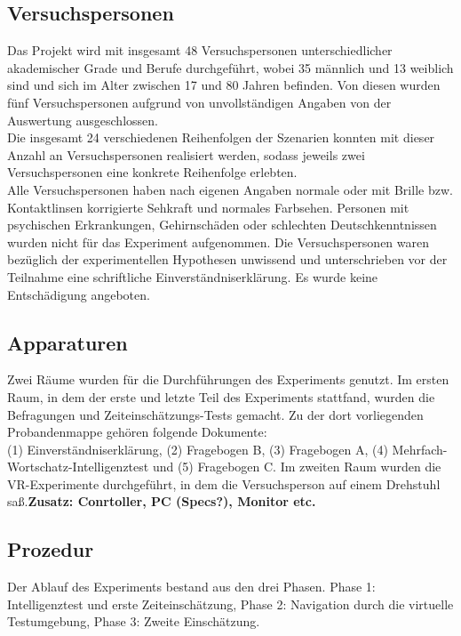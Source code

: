 \documentclass{Paper}
\begin{document}
        \subsection{Versuchspersonen}

Das Projekt wird mit insgesamt 48 Versuchspersonen unterschiedlicher akademischer Grade und Berufe  durchgeführt, wobei 35 männlich und 13 weiblich sind und sich im Alter zwischen 17 und 80 Jahren befinden. Von diesen wurden fünf Versuchspersonen aufgrund von unvollständigen Angaben von der Auswertung ausgeschlossen. \\
Die insgesamt 24 verschiedenen Reihenfolgen der Szenarien konnten mit dieser Anzahl an Versuchspersonen realisiert werden, sodass jeweils zwei Versuchspersonen eine konkrete Reihenfolge erlebten.\\
Alle Versuchspersonen haben nach eigenen Angaben normale oder mit Brille bzw. Kontaktlinsen korrigierte Sehkraft und normales Farbsehen. Personen mit psychischen Erkrankungen, Gehirnschäden oder schlechten Deutschkenntnissen wurden nicht für das Experiment aufgenommen. Die Versuchspersonen waren bezüglich der experimentellen Hypothesen unwissend und unterschrieben vor der Teilnahme eine schriftliche Einverständniserklärung. %
Es wurde keine Entschädigung angeboten. 
               
        \subsection{Apparaturen}
Zwei Räume wurden für die Durchführungen des Experiments genutzt. Im ersten Raum, in dem der erste und letzte Teil des Experiments stattfand, wurden die Befragungen und Zeiteinschätzungs-Tests gemacht.
Zu der dort vorliegenden Probandenmappe gehören folgende Dokumente:\\               
         	(1) Einverständniserklärung, (2) \glqq Fragebogen B\grqq, (3) \glqq Fragebogen A\grqq, (4)
                Mehrfach-Wortschatz-Intelligenztest und (5) \glqq Fragebogen C\grqq.
Im zweiten Raum wurden die VR-Experimente durchgeführt, in dem die Versuchsperson auf einem Drehstuhl saß.\textbf{Zusatz: Conrtoller, PC (Specs?), Monitor etc.}

        \subsection{Prozedur}
Der Ablauf des Experiments bestand aus den drei Phasen. Phase 1: Intelligenztest und erste Zeiteinschätzung, Phase 2: Navigation durch die virtuelle Testumgebung, Phase 3: Zweite Einschätzung.
\end{document}
